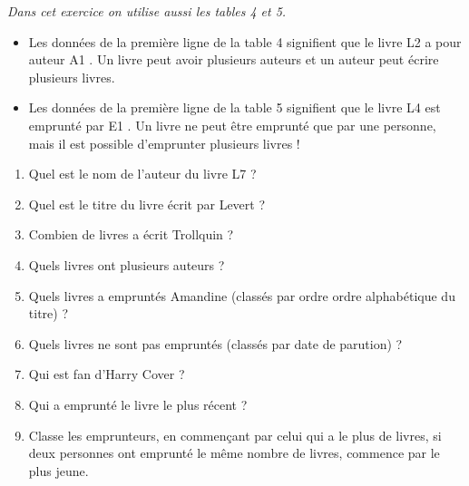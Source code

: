 \documentclass[class=report,crop=false, 12pt]{standalone}
\begin{document}
\begin{activite}

\emph{Dans cet exercice on utilise aussi les tables 4 et 5.}


\medskip

\begin{itemize}
  \item Les données de la première ligne de la table 4 signifient que le livre \og L2 \fg{} a pour auteur \og A1 \fg{}.
  Un livre peut avoir plusieurs auteurs et un auteur peut écrire plusieurs livres.
 
  \item Les données de la première ligne de la table 5 signifient que le livre \og L4 \fg{} est emprunté par \og E1 \fg{}.
  Un livre ne peut être emprunté que par une personne, mais il est possible d'emprunter plusieurs livres !
\end{itemize}


 \begin{enumerate}
  \item Quel est le nom de l'auteur du livre \og L7 \fg{} ?
  \item Quel est le titre du livre écrit par \og Levert\fg{} ?
  \item Combien de livres a écrit \og Trollquin \fg{} ?
  \item Quels livres ont plusieurs auteurs ? 
  
  \item Quels livres a empruntés Amandine (classés par ordre ordre alphabétique du titre) ? 
  \item Quels livres ne sont pas empruntés (classés par date de parution) ?
  \item Qui est fan d'Harry Cover ?
  
  \item Qui a emprunté le livre le plus récent ?
  
  \item Classe les emprunteurs, en commençant par celui qui a le plus de livres, si deux personnes ont emprunté le même nombre de livres, commence par le plus jeune.
  
\end{enumerate}

\end{activite}
\end{document}
